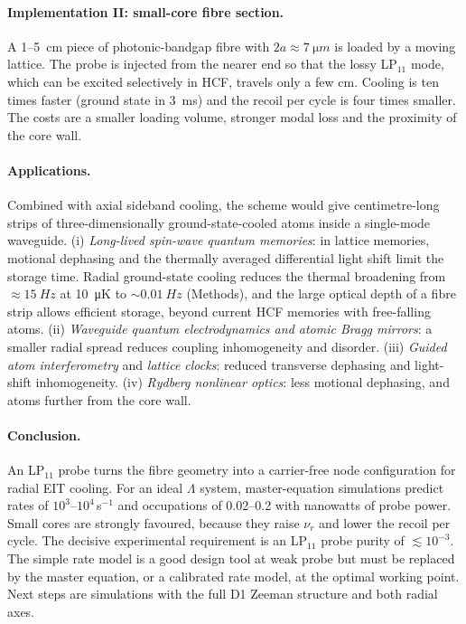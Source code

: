 \documentclass[10pt,twocolumn,a4paper]{article}
\begin{document}
\paragraph{Implementation II: small-core fibre section.} A 1--\SI{5}{cm} piece of photonic-bandgap fibre with $2a\approx\SI{7}{\micro m}$ is loaded by a moving lattice\cite{okaba2014}. The probe is injected from the nearer end so that the lossy LP$_{11}$ mode, which can be excited selectively in HCF\cite{trabold2014}, travels only a few cm. Cooling is ten times faster (ground state in \SI{3}{ms}) and the recoil per cycle is four times smaller. The costs are a smaller loading volume, stronger modal loss and the proximity of the core wall.

\paragraph{Applications.} Combined with axial sideband cooling\cite{leong2020}, the scheme would give centimetre-long strips of three-dimensionally ground-state-cooled atoms inside a single-mode waveguide.
(i) \emph{Long-lived spin-wave quantum memories}: in lattice memories, motional dephasing and the thermally averaged differential light shift limit the storage time\cite{zhao2009,dudin2013}. Radial ground-state cooling reduces the thermal broadening from $\approx\SI{15}{Hz}$ at \SI{10}{\micro K} to $\sim\SI{0.01}{Hz}$ (Methods), and the large optical depth of a fibre strip allows efficient storage\cite{gorshkov2007}, beyond current HCF memories with free-falling atoms\cite{peters2020}.
(ii) \emph{Waveguide quantum electrodynamics and atomic Bragg mirrors}\cite{corzo2016,chang2018}: a smaller radial spread reduces coupling inhomogeneity and disorder.
(iii) \emph{Guided atom interferometry}\cite{xin2018} and \emph{lattice clocks}\cite{okaba2014}: reduced transverse dephasing and light-shift inhomogeneity.
(iv) \emph{Rydberg nonlinear optics}\cite{langbecker2017}: less motional dephasing, and atoms further from the core wall.

\paragraph{Conclusion.} An LP$_{11}$ probe turns the fibre geometry into a carrier-free node configuration for radial EIT cooling. For an ideal $\Lambda$ system, master-equation simulations predict rates of $10^3$--$10^4$\,s$^{-1}$ and occupations of 0.02--0.2 with nanowatts of probe power. Small cores are strongly favoured, because they raise $\nu_r$ and lower the recoil per cycle. The decisive experimental requirement is an LP$_{11}$ probe purity of $\lesssim10^{-3}$. The simple rate model is a good design tool at weak probe but must be replaced by the master equation, or a calibrated rate model, at the optimal working point. Next steps are simulations with the full D1 Zeeman structure and both radial axes.
\end{document}
